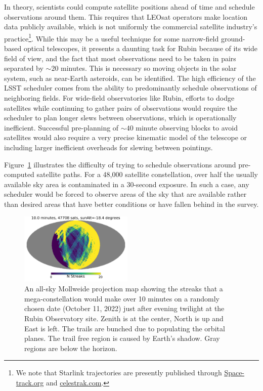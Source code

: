 \documentclass[twocolumn,trackchanges]{aastex63}
\begin{document}
In theory, scientists could compute satellite positions ahead of time and schedule observations around them. This requires that LEOsat operators make location data publicly available, which is not uniformly the commercial satellite industry’s practice\footnote{We note that Starlink trajectories are presently published through \url{Space-track.org} and \url{celestrak.com}.}. While this may be a useful technique for some narrow-field ground-based optical telescopes, it presents a daunting task for Rubin because of its wide field of view, and the fact that most observations need to be taken in pairs separated by $\sim20$ minutes. This is necessary so moving objects in the solar system, such as near-Earth asteroids, can be identified. The high efficiency of the LSST scheduler comes from the ability to predominantly schedule observations of neighboring fields. For wide-field observatories like Rubin, efforts to dodge satellites while continuing to gather pairs of observations would require the scheduler to plan longer slews between observations, which is operationally inefficient. Successful pre-planning of $\sim40$ minute observing blocks to avoid satellites would also require a very precise kinematic model of the telescope or including larger inefficient overheads for slewing between pointings.

Figure~\ref{fig:sat_steps} illustrates the difficulty of trying to schedule observations around pre-computed satellite paths. For a 48,000 satellite constellation, over half the usually available sky area is contaminated in a 30-second exposure. In such a case, any scheduler would be forced to observe areas of the sky that are available rather than desired areas that have better conditions or have fallen behind in the survey. 

\begin{figure}
    \centering
    \includegraphics[width=0.48\textwidth]{tenmin_example.pdf}
    \caption{An all-sky Mollweide projection map showing the streaks that a mega-constellation would make over 10 minutes on a randomly chosen date (October 11, 2022) just after evening twilight at the Rubin Observatory site. Zenith is at the center, North is up and East is left. The trails are bunched due to populating the orbital planes. The trail free region is caused by Earth’s shadow. Gray regions are below the horizon.
 }
    \label{fig:sat_steps}
\end{figure}
\end{document}
